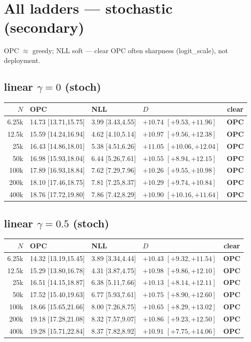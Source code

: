 \documentclass[10pt]{article}
\begin{document}
\section*{All ladders --- stochastic (secondary)}
OPC $\approx$ greedy; NLL soft --- clear OPC often sharpness (logit\_scale), not deployment.

\subsection*{linear $\gamma{=}0$ (stoch)}
{\scriptsize
\begin{tabular}{@{}r lll c@{}}
\toprule
$N$ & OPC & NLL & $D$ & clear \\
\midrule
6.25k & 14.73 [13.71,15.75] & 3.99 [3.43,4.55] & $+10.74$ $[+9.53,+11.96]$ & \textbf{OPC} \\
12.5k & 15.59 [14.24,16.94] & 4.62 [4.10,5.14] & $+10.97$ $[+9.56,+12.38]$ & \textbf{OPC} \\
25k & 16.43 [14.86,18.01] & 5.38 [4.51,6.26] & $+11.05$ $[+10.06,+12.04]$ & \textbf{OPC} \\
50k & 16.98 [15.93,18.04] & 6.44 [5.26,7.61] & $+10.55$ $[+8.94,+12.15]$ & \textbf{OPC} \\
100k & 17.89 [16.93,18.84] & 7.62 [7.29,7.96] & $+10.26$ $[+9.55,+10.98]$ & \textbf{OPC} \\
200k & 18.10 [17.46,18.75] & 7.81 [7.25,8.37] & $+10.29$ $[+9.74,+10.84]$ & \textbf{OPC} \\
400k & 18.76 [17.72,19.80] & 7.86 [7.42,8.29] & $+10.90$ $[+10.16,+11.64]$ & \textbf{OPC} \\
\bottomrule
\end{tabular}}

\subsection*{linear $\gamma{=}0.5$ (stoch)}
{\scriptsize
\begin{tabular}{@{}r lll c@{}}
\toprule
$N$ & OPC & NLL & $D$ & clear \\
\midrule
6.25k & 14.32 [13.19,15.45] & 3.89 [3.34,4.44] & $+10.43$ $[+9.32,+11.54]$ & \textbf{OPC} \\
12.5k & 15.29 [13.80,16.78] & 4.31 [3.87,4.75] & $+10.98$ $[+9.86,+12.10]$ & \textbf{OPC} \\
25k & 16.51 [14.15,18.87] & 6.38 [5.11,7.66] & $+10.13$ $[+8.14,+12.11]$ & \textbf{OPC} \\
50k & 17.52 [15.40,19.63] & 6.77 [5.93,7.61] & $+10.75$ $[+8.90,+12.60]$ & \textbf{OPC} \\
100k & 18.66 [15.65,21.66] & 8.00 [7.26,8.75] & $+10.65$ $[+8.29,+13.02]$ & \textbf{OPC} \\
200k & 19.18 [17.28,21.08] & 8.32 [7.57,9.07] & $+10.86$ $[+9.23,+12.50]$ & \textbf{OPC} \\
400k & 19.28 [15.71,22.84] & 8.37 [7.82,8.92] & $+10.91$ $[+7.75,+14.06]$ & \textbf{OPC} \\
\bottomrule
\end{tabular}}
\end{document}
